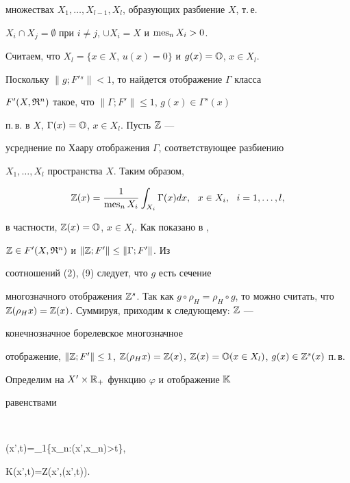 множествах $X_1,\dotsc,X_{l-1},X_l$, образующих разбиение $X$, т.\,е. 


$X_i\cap X_j=\emptyset$ при $i\ne j$, $\cup X_i=X$ и $\operatorname{mes}_n X_i>0$. 


Считаем, что $X_l=\{x\in X$, $u(x)=0\}$ и $g(x)=\Bbb O$, $x\in X_l$. 


Поскольку $\|g;F{}'{}^s\|<1$, то найдется отображение $\Gamma$ класса 


$F'(X,\frak R^n)$ такое, что $\|\Gamma;F'\|\le1$, $g(x)\in\Gamma^s(x)$ 


п.\,в. в $X$, $\Gamma(x)=\Bbb O$, $x\in X_l$. Пусть $\Bbb Z$ --- 


усреднение по Хаару отображения $\Gamma$, соответствующее разбиению 


$X_1,\dotsc,X_l$ пространства $X$. Таким образом, 


\begin{equation} 


\Bbb Z(x)=\frac{1}{\mes_n X_i}\int_{X_i} 


\Gamma(x)d x,\ \ x\in X_i,\ \ i=1,\dotsc,l, 


\end{equation} 


в частности, $\Bbb Z(x)=\Bbb O$, $x\in X_l$. Как показано в \cite{3}, 


$\Bbb Z\in F'(X,\frak R^n)$ и $\|\Bbb Z;F'\|\le\|\Gamma;F'\|$. Из 


соотношений (2), (9) следует, что $g$ есть сечение


многозначного отображения $\Bbb 


Z^s$. Так как $g\circ\rho_H=\rho_H\circ g$, то можно считать, что $\Bbb 


Z(\rho_H x)=\Bbb Z(x)$. Суммируя, приходим к следующему: $\Bbb Z$ --- 


конечнозначное борелевское многозначное


отображение, $\|\Bbb Z;F'\|\le1$, $\Bbb 


Z(\rho_H x)=\Bbb Z(x)$, $\Bbb Z(x)=\Bbb O(x\in X_l)$, $g(x)\in\Bbb 


Z^s(x)$ п.\,в. 


 


Определим на $X'\times\Bbb R_+$ функцию $\varphi$ и отображение $\Bbb K$ 


равенствами 


$$ 


\varphi(x',t)=\mes_1\{x_n:(x',x_n)>t\},\quad 


\Bbb K(x',t)=\Bbb Z(x',\varphi(x',t)). 


